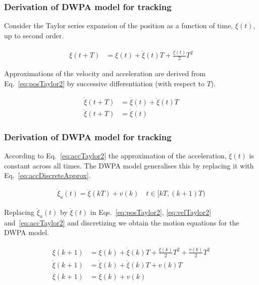 \begin{frame}
    \frametitle{Derivation of DWPA model for tracking}

    Consider the Taylor series expansion of the position as a function of time,
    $\xi(t)$, up to second order.

    \begin{align}
        \xi(t+T)&=\xi(t)+\dot{\xi}(t)T+\frac{\ddot{\xi}(t)}{2}T^2\label{eq:posTaylor2}
    \end{align}

    Approximations of the velocity and acceleration are derived from
    Eq.~\ref{eq:posTaylor2} by successive differentiation (with respect to
    $T$).

    \begin{align}
        \dot{\xi}(t+T)&=\dot{\xi}(t)+\ddot{\xi}(t)T\label{eq:velTaylor2}\\
        \ddot{\xi}(t+T)&=\ddot{\xi}(t)\label{eq:accTaylor2}
    \end{align}

\end{frame}

\begin{frame}
    \frametitle{Derivation of DWPA model for tracking}

    According to Eq.~\ref{eq:accTaylor2} the approximation of the acceleration,
    $\ddot{\xi}(t)$ is constant across all times. The DWPA model generalises
    this by replacing it with Eq.~\ref{eq:accDiscreteApprox}.

    \begin{align}
        \ddot{\xi}_a(t)=\ddot{\xi}(kT)+v(k)\quad t\in[kT,(k+1)T)\label{eq:accDiscreteApprox}
    \end{align}

    Replacing $\ddot{\xi}_a(t)$ by $\ddot{\xi}(t)$ in Eqs.~\ref{eq:posTaylor2},
    \ref{eq:velTaylor2} and~\ref{eq:accTaylor2} and discretizing we obtain the
    motion equations for the DWPA model.

    \begin{align}
        \xi(k+1)&=\xi(k)+\dot{\xi}(k)T+\frac{\ddot{\xi}(k)}{2}T^2+\frac{v(k)}{2}T^2\label{eq:posDWPA}\\
        \dot{\xi}(k+1)&=\dot{\xi}(k)+\ddot{\xi}(k)T+v(k)T\label{eq:velDWPA}\\
        \ddot{\xi}(k+1)&=\ddot{\xi}(k)+v(k)\label{eq:accDWPA}
    \end{align}

\end{frame}

